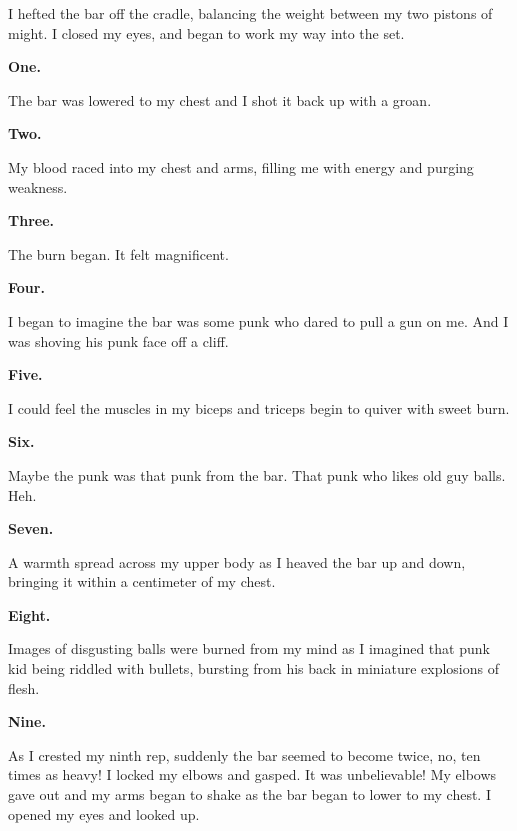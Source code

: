 I hefted the bar off the cradle, balancing the weight between my
two pistons of might. I closed my eyes, and began to work my way
into the set.



{\bf One.}



The bar was lowered to my chest and I shot it back up with a
groan.



{\bf Two.}



My blood raced into my chest and arms, filling me with energy and
purging weakness.



{\bf Three.}



The burn began. It felt magnificent.



{\bf Four.}



I began to imagine the bar was some punk who dared to pull a gun on
me. And I was shoving his punk face off a cliff.



{\bf Five.}



I could feel the muscles in my biceps and triceps begin to quiver
with sweet burn.



{\bf Six.}



Maybe the punk was that punk from the bar. That punk who likes old
guy balls. Heh.



{\bf Seven.}



A warmth spread across my upper body as I heaved the bar up and
down, bringing it within a centimeter of my chest.



{\bf Eight.}



Images of disgusting balls were burned from my mind as I imagined
that punk kid being riddled with bullets, bursting from his back in
miniature explosions of flesh.



{\bf Nine.}



As I crested my ninth rep, suddenly the bar seemed to become twice,
no, ten times as heavy! I locked my elbows and gasped. It was
unbelievable! My elbows gave out and my arms began to shake as the
bar began to lower to my chest. I opened my eyes and looked
up.



